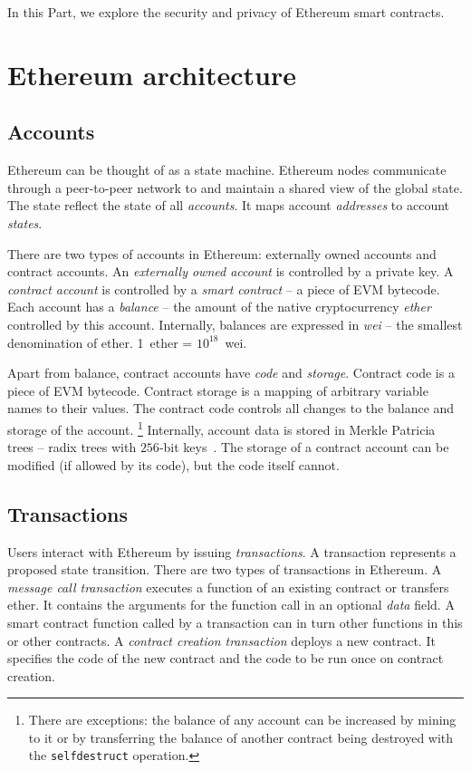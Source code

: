 In this Part, we explore the security and privacy of Ethereum smart contracts.


\section{Ethereum architecture}

\subsection{Accounts}

Ethereum can be thought of as a state machine.
Ethereum nodes communicate through a peer-to-peer network to and maintain a shared view of the global state.
The state reflect the state of all \textit{accounts}.
It maps account \textit{addresses} to account \textit{states}.

There are two types of accounts in Ethereum: externally owned accounts and contract accounts.
An \textit{externally owned account} is controlled by a private key.
A \textit{contract account} is controlled by a \textit{smart contract} -- a piece of EVM bytecode.
Each account has a \textit{balance} -- the amount of the native cryptocurrency \textit{ether} controlled by this account.
Internally, balances are expressed in \textit{wei} -- the smallest denomination of ether.
1~ether = $10^{18}$~wei.

Apart from balance, contract accounts have \textit{code} and \textit{storage}.
Contract code is a piece of EVM bytecode.
Contract storage is a mapping of arbitrary variable names to their values.
The contract code controls all changes to the balance and storage of the account.
\footnote{There are exceptions: the balance of any account can be increased by mining to it or by transferring the balance of another contract being destroyed with the \texttt{selfdestruct} operation.}
Internally, account data is stored in Merkle Patricia trees -- radix trees with $256$-bit keys~\cite{MPTSpec, Buchman14}.
The storage of a contract account can be modified (if allowed by its code), but the code itself cannot.


\subsection{Transactions}

Users interact with Ethereum by issuing \textit{transactions}.
A transaction represents a proposed state transition.
There are two types of transactions in Ethereum.
A \textit{message call transaction} executes a function of an existing contract or transfers ether.
It contains the arguments for the function call in an optional \textit{data} field.
A smart contract function called by a transaction can in turn other functions in this or other contracts.
A \textit{contract creation transaction} deploys a new contract.
It specifies the code of the new contract and the code to be run once on contract creation.

